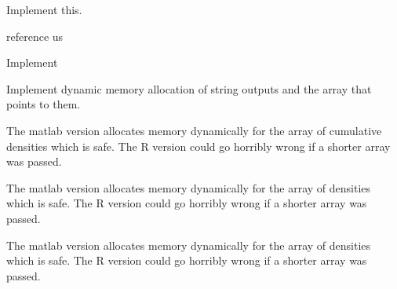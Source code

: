 \begin{DoxyRefList}
\item[\label{todo__todo000011}%
\hypertarget{todo__todo000011}{}%
Global \hyperlink{_hyper_sphere_geodesic_8h_a0fbca3fad98c691523aeb34eaab97d01}{Hyper\-Sphere\-Geodesic\-Distance\-Metric} (int Ncoords, double $\ast$point1, double $\ast$point2, double $\ast$parameters)]Implement this.  
\item[\label{todo__todo000008}%
\hypertarget{todo__todo000008}{}%
Global \hyperlink{_hyper_sphere_geodesic_8h_a16d98ff2d1ad0e4d662b8631c72f9931}{Hyper\-Sphere\-Geodesic\-Distance\-P\-D\-F} (double t, double $\ast$parameters)]reference us  
\item[\label{todo__todo000009}%
\hypertarget{todo__todo000009}{}%
Global \hyperlink{_hyper_sphere_geodesic_8h_a203990a77a11670e5ab591d64461fca4}{Hyper\-Sphere\-Geodesic\-Distance\-Var} (double $\ast$parameters)]Implement  
\item[\label{todo__todo000015}%
\hypertarget{todo__todo000015}{}%
Global \hyperlink{group__api_gadb58de53bac5d2fe684019ce77be9896}{Line\-Picking\-All\-Problems} (char $\ast$$\ast$names, char $\ast$$\ast$, int $\ast$, double $\ast$$\ast$)]Implement dynamic memory allocation of string outputs and the array that points to them.  
\item[\label{todo__todo000018}%
\hypertarget{todo__todo000018}{}%
Global \hyperlink{group__api_ga445ba2c007d60d789747cecbd5f874b9}{Line\-Picking\-C\-D\-F} (double $\ast$, double $\ast$, int $\ast$, int $\ast$, double $\ast$, int $\ast$, int $\ast$, char $\ast$$\ast$)]The matlab version allocates memory dynamically for the array of cumulative densities which is safe. The R version could go horribly wrong if a shorter array was passed.  
\item[\label{todo__todo000019}%
\hypertarget{todo__todo000019}{}%
Global \hyperlink{group__api_ga89bd29435ffe1826e97dafb2b0536de1}{Line\-Picking\-Ncoords} (int $\ast$, char $\ast$$\ast$, int $\ast$, double $\ast$, int $\ast$, int $\ast$, char $\ast$$\ast$)]The matlab version allocates memory dynamically for the array of densities which is safe. The R version could go horribly wrong if a shorter array was passed.  
\item[\label{todo__todo000017}%
\hypertarget{todo__todo000017}{}%
Global \hyperlink{group__api_ga8feba9835984bd74f3d919f51389e573}{Line\-Picking\-P\-D\-F} (double $\ast$, double $\ast$, int $\ast$, int $\ast$, double $\ast$, int $\ast$, int $\ast$, char $\ast$$\ast$)]The matlab version allocates memory dynamically for the array of densities which is safe. The R version could go horribly wrong if a shorter array was passed.  
$$
\end{DoxyRefList}
